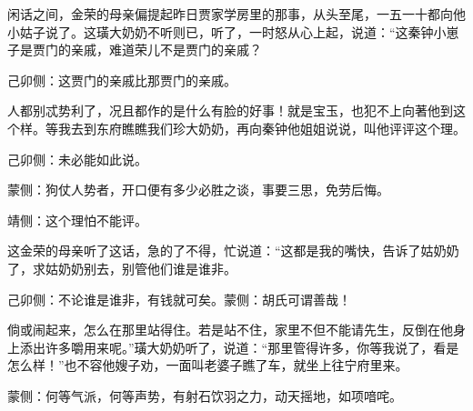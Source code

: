 \begin{parag}
    闲话之间，金荣的母亲偏提起昨日贾家学房里的那事，从头至尾，一五一十都向他小姑子说了。这璜大奶奶不听则已，听了，一时怒从心上起，说道：“这秦钟小崽子是贾门的亲戚，难道荣儿不是贾门的亲戚？\begin{note}己卯侧：这贾门的亲戚比那贾门的亲戚。\end{note}人都别忒势利了，况且都作的是什么有脸的好事！就是宝玉，也犯不上向著他到这个样。等我去到东府瞧瞧我们珍大奶奶，再向秦钟他姐姐说说，叫他评评这个理。\begin{note}己卯侧：未必能如此说。\end{note}\begin{note}蒙侧：狗仗人势者，开口便有多少必胜之谈，事要三思，免劳后悔。\end{note}\begin{note}靖侧：这个理怕不能评。\end{note}这金荣的母亲听了这话，急的了不得，忙说道：“这都是我的嘴快，告诉了姑奶奶了，求姑奶奶别去，别管他们谁是谁非。\begin{note}己卯侧：不论谁是谁非，有钱就可矣。蒙侧：胡氏可谓善哉！\end{note}倘或闹起来，怎么在那里站得住。若是站不住，家里不但不能请先生，反倒在他身上添出许多嚼用来呢。”璜大奶奶听了，说道：“那里管得许多，你等我说了，看是怎么样！”也不容他嫂子劝，一面叫老婆子瞧了车，就坐上往宁府里来。\begin{note}蒙侧：何等气派，何等声势，有射石饮羽之力，动天摇地，如项喑咤。\end{note}
\end{parag}


